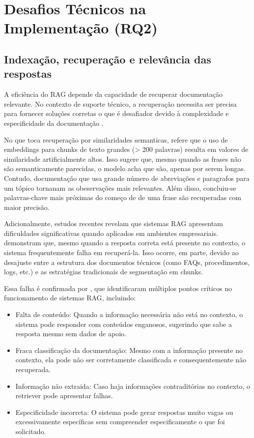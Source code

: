\section{Desafios Técnicos na Implementação (RQ2)}


\subsection{Indexação, recuperação e relevância das respostas}

A eficiência do RAG depende da capacidade de recuperar documentação relevante. No contexto de suporte técnico, a recuperação necessita ser precisa para fornecer soluções corretas o que é desafiador devido à complexidade e especificidade da documentação \parencite{ToroIsaza2024}.


No que toca recuperação por similaridades semanticas, \cite{soman2024observations} refere que o uso de embeddings para chunks de texto grandes (> 200 palavras) resulta em valores de similaridade artificialmente altos. Isso sugere que, mesmo quando as frases não são semanticamente parecidas, o modelo acha que são, apenas por serem longas. Contudo, documentação que usa grande número de abreviações e paragrafos para um tópico tornanam as obeservações mais relevantes. Além disso, concluiu-se palavras-chave mais próximas do começo de de uma frase são recuperadas com maior precisão.

Adicionalmente, estudos recentes revelam que sistemas RAG apresentam dificuldades significativas quando aplicados em ambientes empresariais. \textcite{RAGDoesNotWork2024} demonstram que, mesmo quando a resposta correta está presente no contexto, o sistema frequentemente falha em recuperá-la. Isso ocorre, em parte, devido ao desajuste entre a estrutura dos documentos técnicos (como FAQs, procedimentos, logs, etc.) e as estratégias tradicionais de segmentação em chunks.

Essa falha é confirmada por \textcite{SevenPoints2024}, que identificaram múltiplos pontos críticos no funcionamento de sistemas RAG, incluindo:

\begin{itemize}
    \item Falta de conteúdo: Quando a informação necessária não está no contexto, o sistema pode responder com conteúdos enganosos, sugerindo que sabe a resposta mesmo sem dados de apoio.
    \item Fraca classificação da documentação: Mesmo com a informação presente no contexto, ela pode não ser corretamente classificada e consequentemente não recuperada. 
 \item Informação não extraida: Caso haja informações contraditórias no contexto, o retriever pode apresentar falhas.
  \item Especificidade incorreta: O sistema pode gerar respostas muito vagas ou excessivamente específicas sem compreender especificamente o que foi solicitado.
\end{itemize}


